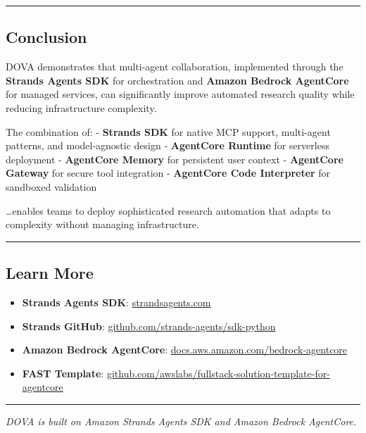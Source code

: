 \begin{center}\rule{0.5\linewidth}{0.5pt}\end{center}

\subsection{Conclusion}\label{conclusion}

DOVA demonstrates that multi-agent collaboration, implemented through
the \textbf{Strands Agents SDK} for orchestration and \textbf{Amazon
Bedrock AgentCore} for managed services, can significantly improve
automated research quality while reducing infrastructure complexity.

The combination of: - \textbf{Strands SDK} for native MCP support,
multi-agent patterns, and model-agnostic design - \textbf{AgentCore
Runtime} for serverless deployment - \textbf{AgentCore Memory} for
persistent user context - \textbf{AgentCore Gateway} for secure tool
integration - \textbf{AgentCore Code Interpreter} for sandboxed
validation

\ldots enables teams to deploy sophisticated research automation that
adapts to complexity without managing infrastructure.

\begin{center}\rule{0.5\linewidth}{0.5pt}\end{center}

\subsection{Learn More}\label{learn-more}

\begin{itemize}
\tightlist
\item
  \textbf{Strands Agents SDK}:
  \href{https://strandsagents.com}{strandsagents.com}
\item
  \textbf{Strands GitHub}:
  \href{https://github.com/strands-agents/sdk-python}{github.com/strands-agents/sdk-python}
\item
  \textbf{Amazon Bedrock AgentCore}:
  \href{https://docs.aws.amazon.com/bedrock-agentcore}{docs.aws.amazon.com/bedrock-agentcore}
\item
  \textbf{FAST Template}:
  \href{https://github.com/awslabs/fullstack-solution-template-for-agentcore}{github.com/awslabs/fullstack-solution-template-for-agentcore}
\end{itemize}

\begin{center}\rule{0.5\linewidth}{0.5pt}\end{center}

\begin{center}
\small
\textit{DOVA is built on Amazon Strands Agents SDK and Amazon Bedrock AgentCore.}
\end{center}
